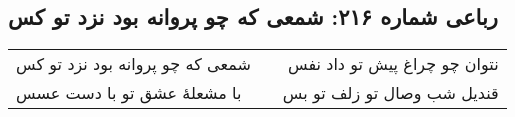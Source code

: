 \begin{center}
\section*{رباعی شماره ۲۱۶: شمعی که چو پروانه بود نزد تو کس}
\label{sec:sh216}
\begin{longtable}{l p{0.5cm} r}
شمعی که چو پروانه بود نزد تو کس
&&
نتوان چو چراغ پیش تو داد نفس
\\
با مشعلهٔ عشق تو با دست عسس
&&
قندیل شب وصال تو زلف تو بس
\\
\end{longtable}
\end{center}

